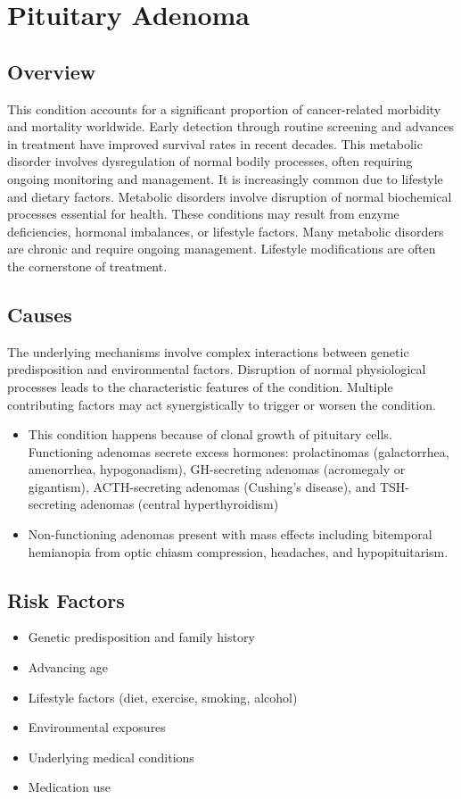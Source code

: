 \chapter{Pituitary Adenoma}
\label{sec:Pituitary Adenoma}

\section{Overview}
This condition accounts for a significant proportion of cancer-related morbidity and mortality worldwide. Early detection through routine screening and advances in treatment have improved survival rates in recent decades. This metabolic disorder involves dysregulation of normal bodily processes, often requiring ongoing monitoring and management. It is increasingly common due to lifestyle and dietary factors. Metabolic disorders involve disruption of normal biochemical processes essential for health. These conditions may result from enzyme deficiencies, hormonal imbalances, or lifestyle factors. Many metabolic disorders are chronic and require ongoing management. Lifestyle modifications are often the cornerstone of treatment.
\section{Causes}
The underlying mechanisms involve complex interactions between genetic predisposition and environmental factors. Disruption of normal physiological processes leads to the characteristic features of the condition. Multiple contributing factors may act synergistically to trigger or worsen the condition.

\begin{itemize}[noitemsep]
  \item This condition happens because of clonal growth of pituitary cells. Functioning adenomas secrete excess hormones: prolactinomas (galactorrhea, amenorrhea, hypogonadism), GH-secreting adenomas (acromegaly or gigantism), ACTH-secreting adenomas (Cushing's disease), and TSH-secreting adenomas (central hyperthyroidism)
  \item Non-functioning adenomas present with mass effects including bitemporal hemianopia from optic chiasm compression, headaches, and hypopituitarism.
\end{itemize}
\section{Risk Factors}
\begin{itemize}[noitemsep]
  \item Genetic predisposition and family history
  \item Advancing age
  \item Lifestyle factors (diet, exercise, smoking, alcohol)
  \item Environmental exposures
  \item Underlying medical conditions
  \item Medication use
\end{itemize}
